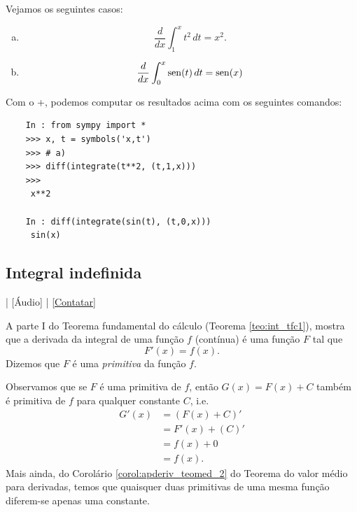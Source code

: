 \begin{ex}
  Vejamos os seguintes casos:
  \begin{enumerate}[a)]
  \item
    \begin{equation}
      \frac{d}{dx}\int_1^x t^2\,dt = x^2.
    \end{equation}
  \item
    \begin{equation}
      \frac{d}{dx}\int_0^x \operatorname{sen}(t)\,dt = \operatorname{sen}(x)
    \end{equation}
  \end{enumerate}

  \ifispython
  Com o {\python}+{\sympy}, podemos computar os resultados acima com os seguintes comandos:
  \begin{lstlisting}
    In : from sympy import *
    >>> x, t = symbols('x,t')
    >>> # a)
    >>> diff(integrate(t**2, (t,1,x)))
    >>> 
     x**2
    
    In : diff(integrate(sin(t), (t,0,x)))
     sin(x)
  \end{lstlisting}
  \fi
\end{ex}

\subsection{Integral indefinida}

\begin{flushright}
  [Vídeo] | [Áudio] | \href{https://phkonzen.github.io/notas/contato.html}{[Contatar]}
\end{flushright}

A parte I do Teorema fundamental do cálculo (Teorema \ref{teo:int_tfc1}), mostra que a derivada da integral de uma função $f$ (contínua) é uma função $F$ tal que
\begin{equation}
  F'(x) = f(x).
\end{equation}
Dizemos que $F$ é uma \emph{primitiva} da função $f$.

Observamos que se $F$ é uma primitiva de $f$, então $G(x) = F(x) + C$ também é primitiva de $f$ para qualquer constante $C$, i.e.
\begin{align}
  G'(x) &= (F(x) + C)' \\
        &= F'(x) + (C)' \\
        &= f(x) + 0 \\
        &= f(x).
\end{align}
Mais ainda, do Corolário \ref{corol:apderiv_teomed_2} do Teorema do valor médio para derivadas, temos que quaisquer duas primitivas de uma mesma função diferem-se apenas uma constante.

